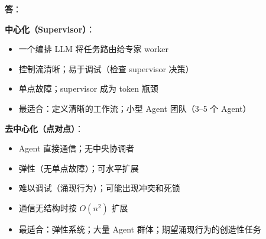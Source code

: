 \begin{questionbox}
\textbf{答}：

\textbf{中心化（Supervisor）}：

\begin{itemize}
  \item 一个编排 LLM 将任务路由给专家 worker
  \item 控制流清晰；易于调试（检查 supervisor 决策）
  \item 单点故障；supervisor 成为 token 瓶颈
  \item 最适合：定义清晰的工作流；小型 Agent 团队（3--5 个 Agent）
\end{itemize}

\textbf{去中心化（点对点）}：

\begin{itemize}
  \item Agent 直接通信；无中央协调者
  \item 弹性（无单点故障）；可水平扩展
  \item 难以调试（涌现行为）；可能出现冲突和死锁
  \item 通信无结构时按 $O(n^2)$ 扩展
  \item 最适合：弹性系统；大量 Agent 群体；期望涌现行为的创造性任务
\end{itemize}


\end{questionbox}
